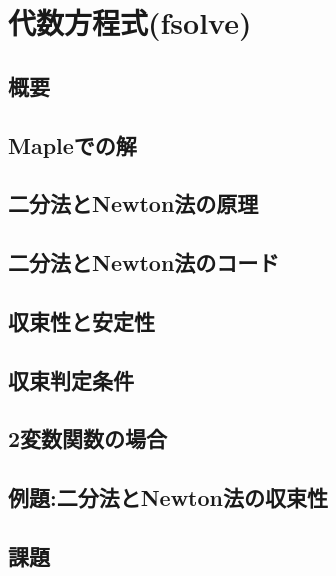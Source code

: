 \documentclass[10pt,a4j]{jreport}
\begin{document}
\chapter{代数方程式(fsolve)}
\section{概要}

\section{Mapleでの解}

\section{二分法とNewton法の原理}

\section{二分法とNewton法のコード}

\section{収束性と安定性}

\section{収束判定条件}

\section{2変数関数の場合}

\section{例題:二分法とNewton法の収束性}

\section{課題}

\end{document}
